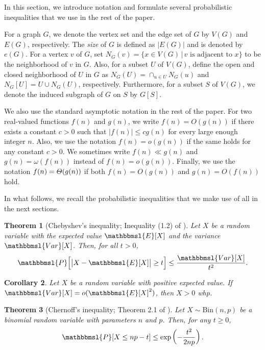 \documentclass[hidelinks, 11pt]{article}
\theoremstyle{plain}
\newtheorem{theorem}{Theorem}[section]
\newtheorem{corollary}[theorem]{Corollary}
\theoremstyle{definition}
\begin{document}
In this section, we introduce notation  and formulate several probabilistic inequalities  that we use in the rest of the  paper.


For a graph $G$, we denote  the vertex set and the edge set of   $G$  by $V(G)$ and $E(G)$, respectively.
The  {\sl size} of $G$ is  defined as   $|E(G)|$ and is denoted by $e(G)$.
For a vertex $v$ of $G$, set $N_G(v)=\{x\in V(G) \, | \, v \text{  is adjacent to } x\}$ to be the neighborhood of   $v$ in $G$. Also, for a subset $U$ of $V(G)$, define the open and closed neighborhood of $U$ in $G$ as $N_G(U)=\cap_{u\in U} N_G(u)$  and $N_G[U]=U \cup N_G(U)$, respectively.
Furthermore, for  a subset $S$ of $V(G)$, we denote the induced subgraph of $G$ on $S$  by $G[S]$.


We also use the standard asymptotic notation in the rest of the paper. For two real-valued functions $f(n)$ and $g(n)$, we write $f(n)=O(g(n))$ if there exists a constant $c>0$   such that $|f(n)|\leq cg(n)$ for every   large enough integer $n$. Also, we use the notation  $f(n)=o(g(n))$ if the same holds for any constant $c>0$.    We sometimes  write    $f(n)\ll g(n)$  and   $g(n)=\omega(f(n))$ instead of   $f(n)=o(g(n))$. Finally, we use the notation   $f(n)=\mathnormal{\Theta}(g(n))$ if both   $f(n)=O(g(n))$ and $g(n)=O(f(n))$  hold.


In what follows, we   recall the  probabilistic inequalities that we make use of all in the  next sections.


\begin{theorem}[Chebyshev's inequality;  Inequality (1.2)  of  \cite{RG}]\label{chebyshev}
Let   $X$ be a  random variable with the expected value    $\mathbbmsl{E}[X]$ and   the variance  $\mathbbmsl{Var}[X]$. Then,  for all  $t>0$,
$$\mathbbmsl{P}\Big[\big|X-\mathbbmsl{E}[X]\big|\geq t\Big]\leq\frac{\mathbbmsl{Var}[X]}{t^2}.$$
\end{theorem}


\begin{corollary}\label{Second-Moment}
Let   $X$ be a     random variable   with positive   expected value. If   $\mathbbmsl{Var}[X]=o(\mathbbmsl{E}[X]^2)$, then $X>0$  whp.
\end{corollary}



\begin{theorem}[Chernoff's inequality;  Theorem 2.1 of  \cite{RG}]\label{chernoff}
Let   $X\sim\mathrm{Bin}(n,p)$ be a binomial random variable  with parameters $n$ and $p$. Then, for any  $t\geq 0$,
$$\mathbbmsl{P}[X\leq np-t]\leq\exp \left(-\frac{t^2}{2np}\right).$$
\end{theorem}
\end{document}
